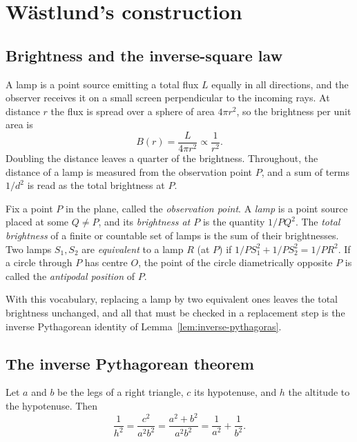 \section{W\"astlund's construction}\label{sec:wastlund}

\subsection{Brightness and the inverse-square law}

A lamp is a point source emitting a total flux $L$ equally in all directions, and the
observer receives it on a small screen perpendicular to the incoming rays. At distance $r$
the flux is spread over a sphere of area $4\pi r^{2}$, so the brightness per unit area is
\begin{equation}
  B(r)=\frac{L}{4\pi r^{2}}\propto\frac{1}{r^{2}}.
  \label{eq:inverse-square}
\end{equation}
Doubling the distance leaves a quarter of the brightness. Throughout, the distance of a lamp
is measured from the observation point $P$, and a sum of terms $1/d^{2}$ is read as the total
brightness at $P$.

\begin{definition}\label{def:lamps}
Fix a point $P$ in the plane, called the \emph{observation point}. A \emph{lamp} is a point
source placed at some $Q\neq P$, and its \emph{brightness at $P$} is the quantity
$1/PQ^{2}$. The \emph{total brightness} of a finite or countable set of lamps is the sum of
their brightnesses. Two lamps $S_{1},S_{2}$ are \emph{equivalent} to a lamp $R$ (at $P$) if
$1/PS_{1}^{2}+1/PS_{2}^{2}=1/PR^{2}$. If a circle through $P$ has centre $O$, the point of the
circle diametrically opposite $P$ is called the \emph{antipodal position} of $P$.
\end{definition}

With this vocabulary, replacing a lamp by two equivalent ones leaves the total brightness
unchanged, and all that must be checked in a replacement step is the inverse Pythagorean
identity of Lemma~\ref{lem:inverse-pythagoras}.

\subsection{The inverse Pythagorean theorem}

\begin{lemma}\label{lem:inverse-pythagoras}
Let $a$ and $b$ be the legs of a right triangle, $c$ its hypotenuse, and $h$ the altitude to
the hypotenuse. Then
\begin{equation}
  \frac{1}{h^{2}}
  =\frac{c^{2}}{a^{2}b^{2}}
  =\frac{a^{2}+b^{2}}{a^{2}b^{2}}
  =\frac{1}{a^{2}}+\frac{1}{b^{2}}.
  \label{eq:inverse-pythagoras}
\end{equation}
\end{lemma}

